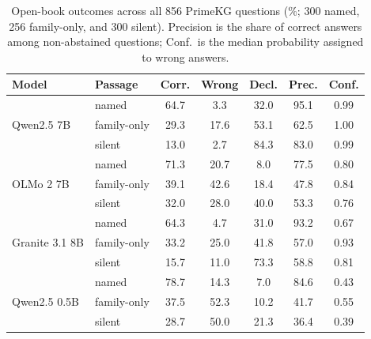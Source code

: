 \begin{table}[ht]
\centering
\small
\setlength{\tabcolsep}{2.8pt}
\begin{tabular}{llccccc}
\toprule
Model & Passage & Corr. & Wrong & Decl. & Prec. & Conf. \\
\midrule
\multirow{3}{*}{Qwen2.5 7B} & named & 64.7 & 3.3 & 32.0 & 95.1 & 0.99 \\
 & family-only & 29.3 & 17.6 & 53.1 & 62.5 & 1.00 \\
 & silent & 13.0 & 2.7 & 84.3 & 83.0 & 0.99 \\
\midrule
\multirow{3}{*}{OLMo 2 7B} & named & 71.3 & 20.7 & 8.0 & 77.5 & 0.80 \\
 & family-only & 39.1 & 42.6 & 18.4 & 47.8 & 0.84 \\
 & silent & 32.0 & 28.0 & 40.0 & 53.3 & 0.76 \\
\midrule
\multirow{3}{*}{Granite 3.1 8B} & named & 64.3 & 4.7 & 31.0 & 93.2 & 0.67 \\
 & family-only & 33.2 & 25.0 & 41.8 & 57.0 & 0.93 \\
 & silent & 15.7 & 11.0 & 73.3 & 58.8 & 0.81 \\
\midrule
\multirow{3}{*}{Qwen2.5 0.5B} & named & 78.7 & 14.3 & 7.0 & 84.6 & 0.43 \\
 & family-only & 37.5 & 52.3 & 10.2 & 41.7 & 0.55 \\
 & silent & 28.7 & 50.0 & 21.3 & 36.4 & 0.39 \\
\bottomrule
\end{tabular}
\caption{Open-book outcomes across all 856 PrimeKG questions (\%; 300 named, 256 family-only, and 300 silent). Precision is the share of correct answers among non-abstained questions; Conf.\ is the median probability assigned to wrong answers.}
\label{tab:all_page}
\end{table}